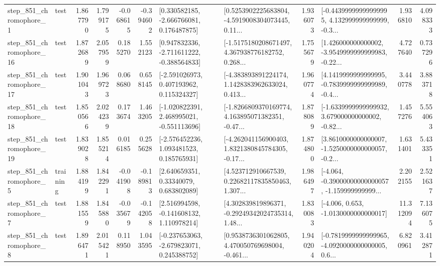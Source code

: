 \begin{tabular}{llrrrrllrlrr}
   step\_851\_chromophore\_1 &      test &      1.867790 &    1.799175 &     -0.068615 & -0.394602 &    [0.330582185, -2.666766081, 0.176487875] &  [0.5253902225683804, -4.5919008304073445, 0.11... &       1.936073 &  [-0.44399999999999995, 4.132999999999999, -0.3... &            1.936810 &          4.098333 \\
  step\_851\_chromophore\_16 &      test &      1.872689 &    2.057959 &      0.185270 &  1.552123 &   [0.947832336, -2.711611222, -0.388564833] &  [-1.5175180208671497, 4.367938776182752, 0.268... &       1.755679 &  [1.426000000000002, -3.9549999999999983, -0.22... &            4.727640 &          0.737296 \\
  step\_851\_chromophore\_17 &      test &      1.901043 &    1.969723 &      0.068680 &  0.658145 &    [-2.591026973, 0.407193962, 0.115324327] &  [-4.383893891224174, 1.1428383962633024, 0.413... &       1.960774 &  [4.1419999999999995, -0.7839999999999989, -0.4... &            3.440778 &          3.883718 \\
  step\_851\_chromophore\_18 &      test &      1.850566 &    2.024239 &      0.173674 &  1.463205 &   [-1.020822391, 2.468995021, -0.551113696] &  [-1.8266809370169774, 4.163895071382351, -0.47... &       1.878089 &  [-1.6339999999999932, 3.679000000000002, -0.82... &            1.457276 &          5.554063 \\
  step\_851\_chromophore\_19 &      test &      1.839028 &    1.855214 &      0.016185 &  0.255628 &    [-2.576452236, 1.093481523, 0.185765931] &  [-4.262041156900403, 1.8321380845784305, -0.17... &       1.874800 &  [3.8610000000000007, -1.5250000000000057, -0.2... &            1.631401 &          5.433351 \\
   step\_851\_chromophore\_5 &  training &      1.884199 &    1.842291 &     -0.041908 & -0.189813 &      [2.640659351, 0.33340079, 0.683802089] &  [4.523712910667539, 0.22682117835850463, 1.307... &       1.986497 &  [-4.064, -0.39000000000000057, -1.159999999999... &            2.202155 &          2.521637 \\
   step\_851\_chromophore\_7 &      test &      1.881559 &    1.845880 &     -0.035679 & -0.142058 &    [2.516994598, -0.141608132, 1.110978214] &  [4.302839819896371, -0.29249342024735314, 1.48... &       1.830083 &               [-4.006, 0.653, -1.0130000000000017] &           11.312094 &          7.136075 \\
   step\_851\_chromophore\_8 &      test &      1.896471 &    2.015421 &      0.118950 &  1.043595 &   [-0.237653063, -2.679823071, 0.245388752] &  [0.9538736301062805, 4.470050769698004, -0.461... &       1.940204 &  [-0.7819999999999965, -4.0920000000000005, 0.6... &            6.820961 &          3.412871 \\

\end{tabular}
